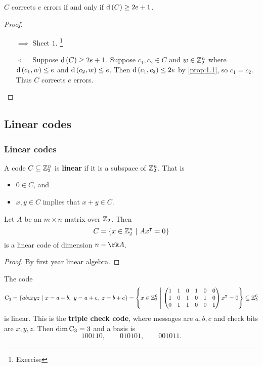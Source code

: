 \begin{proposition}
\label{prop:1.2}
$ C $ corrects $ e $ errors if and only if $ \d\br{C} \ge 2e + 1 $.
\end{proposition}

\begin{proof}
\hfill
\begin{itemize}
\item[$ \implies $] Sheet $ 1 $. \footnote{Exercise}
\item[$ \impliedby $] Suppose $ \d\br{C} \ge 2e + 1 $. Suppose $ c_1, c_2 \in C $ and $ w \in \mathbb{Z}_2^n $ where $ \d\br{c_1, w} \le e $ and $ \d\br{c_2, w} \le e $. Then $ \d\br{c_1, c_2} \le 2e $ by \ref{prop:1.1}, so $ c_1 = c_2 $. Thus $ C $ corrects $ e $ errors.
\end{itemize}
\end{proof}

\pagebreak

\subsection{Linear codes}

\subsubsection{Linear codes}

\begin{definition*}
A code $ C \subseteq \mathbb{Z}_2^n $ is \textbf{linear} if it is a subspace of $ \mathbb{Z}_2^n $. That is
\begin{itemize}
\item $ 0 \in C $, and
\item $ x, y \in C $ implies that $ x + y \in C $.
\end{itemize}
\end{definition*}

\begin{proposition}
Let $ A $ be an $ m \times n $ matrix over $ \mathbb{Z}_2 $. Then
$$ C = \cbr{x \in \ZZ_2^n \st Ax^\intercal = 0} $$
is a linear code of dimension $ n - \rk A $.
\end{proposition}

\begin{proof}
By first year linear algebra.
\end{proof}

\begin{example*}
The code
$$ \C_3 = \cbr{abcxyz \st x = a + b, \ y = a + c, \ z = b + c} = \cbr{x \in \ZZ_2^6 \st \threebythree{1 & 1}{0 & 1}{0 & 0}{1 & 0}{1 & 0}{1 & 0}{0 & 1}{1 & 0}{0 & 1}x^\intercal = 0} \subseteq \ZZ_2^6 $$
is linear. This is the \textbf{triple check code}, where messages are $ a, b, c $ and check bits are $ x, y, z $. Then $ \dim \mathrm{C}_3 = 3 $ and a basis is
$$ 100110, \qquad 010101, \qquad 001011. $$
\end{example*}

